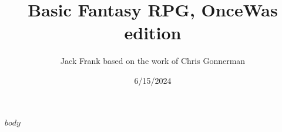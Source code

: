 \documentclass{book}
\begin{document}
\title{Basic Fantasy RPG, OnceWas edition}
\author{Jack Frank based on the work of Chris Gonnerman}
\date{6/15/2024}
\maketitle

\tableofcontents

$body$ %
\end{document}
